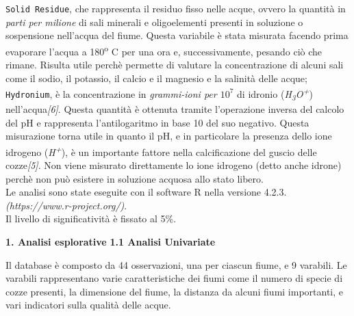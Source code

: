 \documentclass{article} %
\begin{document}
\texttt{Solid Residue}, che rappresenta il residuo fisso nelle acque, ovvero la quantità in \textit{parti per milione} di sali minerali e oligoelementi presenti in soluzione o sospensione nell'acqua del fiume. Questa variabile è stata misurata facendo prima evaporare l'acqua a 180\textsuperscript{o} C per una ora e, successivamente, pesando ciò che rimane. Risulta utile perchè permette di valutare la concentrazione di alcuni sali come il sodio, il potassio, il calcio e il magnesio e la salinità delle acque; 
\texttt{Hydronium}, è la concentrazione in \textit{grammi-ioni per $10^7$} di idronio (\textit{H\textsubscript{3}O\textsuperscript{+}}) nell'acqua\textit{[6]}. Questa quantità è ottenuta tramite l'operazione inversa del calcolo del pH e rappresenta l'antilogaritmo in base 10 del suo negativo. Questa misurazione torna utile in quanto il pH, e in particolare la presenza dello ione idrogeno (\textit{H\textsuperscript{+}}), è un importante fattore nella calcificazione del guscio delle cozze\textit{[5]}. Non viene misurato direttamente lo ione idrogeno (detto anche idrone) perchè non può esistere in soluzione acquosa allo stato libero. \\
Le analisi sono state eseguite con il software R nella versione 4.2.3.\\\textit{(https://www.r-project.org/)}.\\ Il livello di significatività è fissato al 5\%.


\newpage
\begin{flushleft}
    \textbf{\Huge 1. \: Analisi esplorative}
    \vskip 30pt
    \textbf{\Large 1.1 \: Analisi Univariate}
\end{flushleft}
\vskip 10pt

Il database è composto da 44 osservazioni, una per ciascun fiume, e 9 varabili. 
Le varabili rappresentano varie caratteristiche dei fiumi come il numero di specie di cozze presenti, la dimensione del fiume, la distanza da alcuni fiumi importanti, e vari indicatori sulla qualità delle acque.\\
\end{document}

